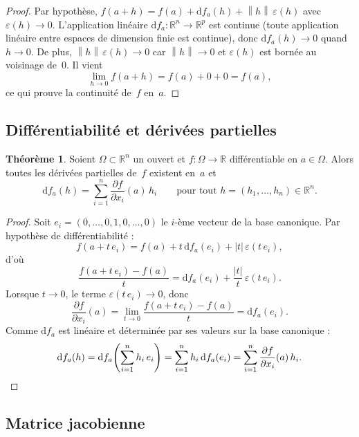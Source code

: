 \documentclass[12pt,a4paper,openany]{book}
\theoremstyle{definition}
\newtheorem{theoreme}{Théorème}[chapter]
\newcommand{\R}{\mathbb{R}}
\newcommand{\eps}{\varepsilon}
\newcommand{\abs}[1]{\left\lvert #1 \right\rvert}
\newcommand{\norm}[1]{\left\lVert #1 \right\rVert}
\newcommand{\dd}{\mathrm{d}}
\begin{document}
\begin{proof}
  Par hypothèse, $f(a+h) = f(a) + \dd f_a(h) + \norm{h}\,\eps(h)$ avec $\eps(h) \to 0$. L'application linéaire $\dd f_a \colon \R^n \to \R^p$ est continue (toute application linéaire entre espaces de dimension finie est continue), donc $\dd f_a(h) \to 0$ quand $h \to 0$. De plus, $\norm{h}\,\eps(h) \to 0$ car $\norm{h} \to 0$ et $\eps(h)$ est bornée au voisinage de~$0$. Il vient
  \[
    \lim_{h \to 0} f(a+h) = f(a) + 0 + 0 = f(a),
  \]
  ce qui prouve la continuité de~$f$ en~$a$.
\end{proof}

\subsection{Différentiabilité et dérivées partielles}

\begin{theoreme}
  \label{thm:diff-implique-partielles}
  Soient $\Omega \subset \R^n$ un ouvert et $f \colon \Omega \to \R$ différentiable en $a \in \Omega$. Alors toutes les dérivées partielles de~$f$ existent en~$a$ et
  \[
    \dd f_a(h) = \sum_{i=1}^n \frac{\partial f}{\partial x_i}(a) \, h_i
    \qquad \text{pour tout } h = (h_1, \ldots, h_n) \in \R^n.
  \]
\end{theoreme}

\begin{proof}
  Soit $e_i = (0, \ldots, 0, 1, 0, \ldots, 0)$ le $i$-ème vecteur de la base canonique. Par hypothèse de différentiabilité :
  \[
    f(a + t \, e_i) = f(a) + t\,\dd f_a(e_i) + \abs{t}\,\eps(t\,e_i),
  \]
  d'où
  \[
    \frac{f(a + t\,e_i) - f(a)}{t} = \dd f_a(e_i) + \frac{\abs{t}}{t}\,\eps(t\,e_i).
  \]
  Lorsque $t \to 0$, le terme $\eps(t\,e_i) \to 0$, donc
  \[
    \frac{\partial f}{\partial x_i}(a)
    = \lim_{t \to 0} \frac{f(a + t\,e_i) - f(a)}{t}
    = \dd f_a(e_i).
  \]
  Comme $\dd f_a$ est linéaire et déterminée par ses valeurs sur la base canonique :
  \[
    \dd f_a(h) = \dd f_a\!\left(\sum_{i=1}^n h_i \, e_i\right) = \sum_{i=1}^n h_i \, \dd f_a(e_i) = \sum_{i=1}^n \frac{\partial f}{\partial x_i}(a) \, h_i. \qedhere
  \]
\end{proof}

\subsection{Matrice jacobienne}
\end{document}
